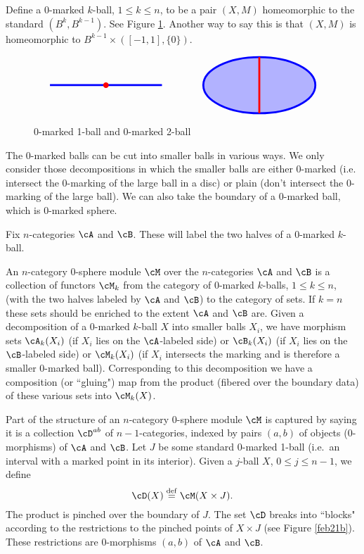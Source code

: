 Define a $0$-marked $k$-ball, $1\le k \le n$, to be a pair  $(X, M)$ homeomorphic to the standard
$(B^k, B^{k-1})$.
See Figure \ref{feb21a}.
Another way to say this is that $(X, M)$ is homeomorphic to $B^{k-1}\times([-1,1], \{0\})$.

\begin{figure}[t]
$$\tikz[baseline,line width=2pt]{\draw[blue] (-2,0)--(2,0); \fill[red] (0,0) circle (0.1);} \qquad \qquad \tikz[baseline,line width=2pt]{\draw[blue][fill=blue!30!white] (0,0) circle (2 and 1); \draw[red] (0,1)--(0,-1);}$$
\caption{0-marked 1-ball and 0-marked 2-ball}
\label{feb21a}
\end{figure}

The $0$-marked balls can be cut into smaller balls in various ways.
We only consider those decompositions in which the smaller balls are either
$0$-marked (i.e. intersect the $0$-marking of the large ball in a disc) 
or plain (don't intersect the $0$-marking of the large ball).
We can also take the boundary of a $0$-marked ball, which is $0$-marked sphere.

Fix $n$-categories $\cA$ and $\cB$.
These will label the two halves of a $0$-marked $k$-ball.

An $n$-category $0$-sphere module $\cM$ over the $n$-categories $\cA$ and $\cB$ is a collection of functors $\cM_k$ from the category
of $0$-marked $k$-balls, $1\le k \le n$,
(with the two halves labeled by $\cA$ and $\cB$) to the category of sets.
If $k=n$ these sets should be enriched to the extent $\cA$ and $\cB$ are.
Given a decomposition of a $0$-marked $k$-ball $X$ into smaller balls $X_i$, we have
morphism sets $\cA_k(X_i)$ (if $X_i$ lies on the $\cA$-labeled side)
or $\cB_k(X_i)$ (if $X_i$ lies on the $\cB$-labeled side)
or $\cM_k(X_i)$ (if $X_i$ intersects the marking and is therefore a smaller 0-marked ball).
Corresponding to this decomposition we have a composition (or ``gluing") map
from the product (fibered over the boundary data) of these various sets into $\cM_k(X)$.

\medskip

Part of the structure of an $n$-category 0-sphere module $\cM$  is captured by saying it is
a collection $\cD^{ab}$ of $n{-}1$-categories, indexed by pairs $(a, b)$ of objects (0-morphisms)
of $\cA$ and $\cB$.
Let $J$ be some standard 0-marked 1-ball (i.e.\ an interval with a marked point in its interior).
Given a $j$-ball $X$, $0\le j\le n-1$, we define
\[
	\cD(X) \deq \cM(X\times J) .
\]
The product is pinched over the boundary of $J$.
The set $\cD$ breaks into ``blocks" according to the restrictions to the pinched points of $X\times J$
(see Figure \ref{feb21b}).
These restrictions are 0-morphisms $(a, b)$ of $\cA$ and $\cB$.

